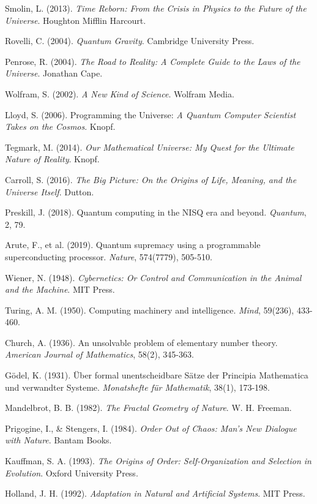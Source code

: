 \documentclass[12pt,a4paper]{article}
\begin{document}
\begin{thebibliography}{99}
Smolin, L. (2013). \textit{Time Reborn: From the Crisis in Physics to the Future of the Universe}. Houghton Mifflin Harcourt.

Rovelli, C. (2004). \textit{Quantum Gravity}. Cambridge University Press.

Penrose, R. (2004). \textit{The Road to Reality: A Complete Guide to the Laws of the Universe}. Jonathan Cape.

Wolfram, S. (2002). \textit{A New Kind of Science}. Wolfram Media.

Lloyd, S. (2006). Programming the Universe: \textit{A Quantum Computer Scientist Takes on the Cosmos}. Knopf.

Tegmark, M. (2014). \textit{Our Mathematical Universe: My Quest for the Ultimate Nature of Reality}. Knopf.

Carroll, S. (2016). \textit{The Big Picture: On the Origins of Life, Meaning, and the Universe Itself}. Dutton.

Preskill, J. (2018). Quantum computing in the NISQ era and beyond. \textit{Quantum}, 2, 79.

Arute, F., et al. (2019). Quantum supremacy using a programmable superconducting processor. \textit{Nature}, 574(7779), 505-510.

Wiener, N. (1948). \textit{Cybernetics: Or Control and Communication in the Animal and the Machine}. MIT Press.

Turing, A. M. (1950). Computing machinery and intelligence. \textit{Mind}, 59(236), 433-460.

Church, A. (1936). An unsolvable problem of elementary number theory. \textit{American Journal of Mathematics}, 58(2), 345-363.

Gödel, K. (1931). Über formal unentscheidbare Sätze der Principia Mathematica und verwandter Systeme. \textit{Monatshefte für Mathematik}, 38(1), 173-198.

Mandelbrot, B. B. (1982). \textit{The Fractal Geometry of Nature}. W. H. Freeman.

Prigogine, I., \& Stengers, I. (1984). \textit{Order Out of Chaos: Man's New Dialogue with Nature}. Bantam Books.

Kauffman, S. A. (1993). \textit{The Origins of Order: Self-Organization and Selection in Evolution}. Oxford University Press.

Holland, J. H. (1992). \textit{Adaptation in Natural and Artificial Systems}. MIT Press.

\end{thebibliography}
\end{document}
